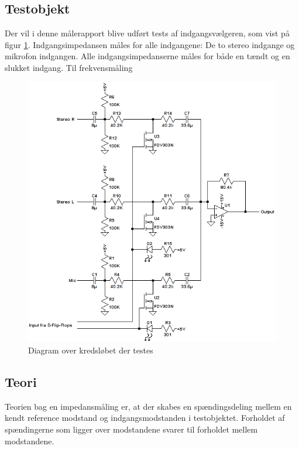 \subsection*{Testobjekt}
\label{maalejournal_testobjekt}
Der vil i denne målerapport blive udført tests af indgangsvælgeren, som vist på figur \ref{maalerap-diagram_simulering}. Indgangsimpedansen måles for alle indgangene: De to stereo indgange og mikrofon indgangen. Alle indgangsimpedanserne måles for både en tændt og en slukket indgang.
Til frekvensmåling 
\begin{figure}[h]
\centering
\includegraphics[scale=0.8]{maalerapporter/indgangsvaelger/indgangvaelger_ltspice_diagram.png}
\caption{Diagram over kredsløbet der testes}
\label{maalerap-diagram_simulering}
\end{figure}

\subsection*{Teori}
\label{maalejournal_teori}
Teorien bag en impedansmåling er, at der skabes en spændingsdeling mellem en kendt reference modstand og indgangsmodstanden i testobjektet. Forholdet af spændingerne som ligger over modstandene svarer til forholdet mellem modstandene.

